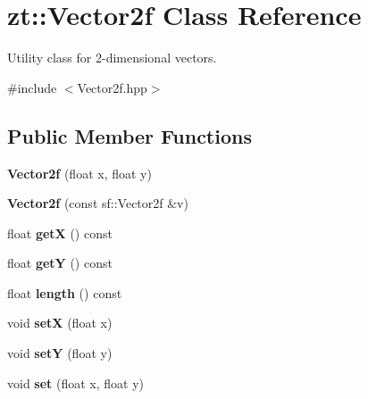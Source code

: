 \hypertarget{classzt_1_1_vector2f}{}\section{zt\+:\+:Vector2f Class Reference}
\label{classzt_1_1_vector2f}


Utility class for 2-\/dimensional vectors.  




{\ttfamily \#include $<$Vector2f.\+hpp$>$}

\subsection*{Public Member Functions}
\begin{DoxyCompactItemize}
\item 
\mbox{\label{classzt_1_1_vector2f_a94fc942a263a91f4f33d2821ee9c8acd}} 
{\bfseries Vector2f} (float x, float y)
\item 
\mbox{\label{classzt_1_1_vector2f_a50ad9da433750914c687db6ede87e0a7}} 
{\bfseries Vector2f} (const sf\+::\+Vector2f \&v)
\item 
\mbox{\label{classzt_1_1_vector2f_a94ee9212d0ccaf6e88fd22f400925d24}} 
float {\bfseries getX} () const
\item 
\mbox{\label{classzt_1_1_vector2f_a4c33e6e5f654d4e330ec802a3eefcd96}} 
float {\bfseries getY} () const
\item 
\mbox{\label{classzt_1_1_vector2f_abe058bbefd3d3490ed56e0b220724472}} 
float {\bfseries length} () const
\item 
\mbox{\label{classzt_1_1_vector2f_adf28079a299c65def555c97d3fb9c51d}} 
void {\bfseries setX} (float x)
\item 
\mbox{\label{classzt_1_1_vector2f_a6e6f512e24654940ca3cc20c97a24871}} 
void {\bfseries setY} (float y)
\item 
\mbox{\label{classzt_1_1_vector2f_aa3318b77bb7ace0065c93f1d110b189f}} 
void {\bfseries set} (float x, float y)

\end{DoxyCompactItemize}
